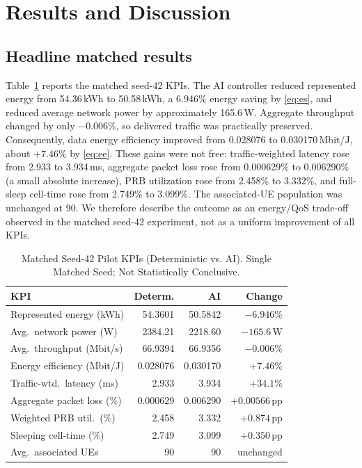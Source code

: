 \documentclass[conference]{IEEEtran}
\begin{document}
\section{Results and Discussion}
\subsection{Headline matched results}
Table~\ref{tab:headline} reports the matched seed-42 KPIs. The AI controller reduced represented energy from 54.36\,kWh to 50.58\,kWh, a 6.946\% energy saving by \eqref{eq:es}, and reduced average network power by approximately 165.6\,W. Aggregate throughput changed by only $-0.006\%$, so delivered traffic was practically preserved. Consequently, data energy efficiency improved from 0.028076 to 0.030170\,Mbit/J, about $+7.46\%$ by \eqref{eq:ee}. These gains were not free: traffic-weighted latency rose from 2.933 to 3.934\,ms, aggregate packet loss rose from 0.000629\% to 0.006290\% (a small absolute increase), PRB utilization rose from 2.458\% to 3.332\%, and full-sleep cell-time rose from 2.749\% to 3.099\%. The associated-UE population was unchanged at 90. We therefore describe the outcome as an energy/QoS trade-off observed in the matched seed-42 experiment, not as a uniform improvement of all KPIs.

\begin{table}[htbp]
\caption{Matched Seed-42 Pilot KPIs (Deterministic vs. AI). Single Matched Seed; Not Statistically Conclusive.}
\begin{center}
\renewcommand{\arraystretch}{1.15}
\begin{tabular}{|l|r|r|r|}
\hline
\textbf{KPI} & \textbf{Determ.} & \textbf{AI} & \textbf{Change} \\
\hline
Represented energy (kWh) & 54.3601 & 50.5842 & $-6.946\%$ \\
\hline
Avg.\ network power (W) & 2384.21 & 2218.60 & $-165.6$\,W \\
\hline
Avg.\ throughput (Mbit/s) & 66.9394 & 66.9356 & $-0.006\%$ \\
\hline
Energy efficiency (Mbit/J) & 0.028076 & 0.030170 & $+7.46\%$ \\
\hline
Traffic-wtd.\ latency (ms) & 2.933 & 3.934 & $+34.1\%$ \\
\hline
Aggregate packet loss (\%) & 0.000629 & 0.006290 & $+0.00566$\,pp \\
\hline
Weighted PRB util.\ (\%) & 2.458 & 3.332 & $+0.874$\,pp \\
\hline
Sleeping cell-time (\%) & 2.749 & 3.099 & $+0.350$\,pp \\
\hline
Avg.\ associated UEs & 90 & 90 & unchanged \\
\hline
\end{tabular}
\label{tab:headline}
\end{center}
\end{table}
\end{document}
